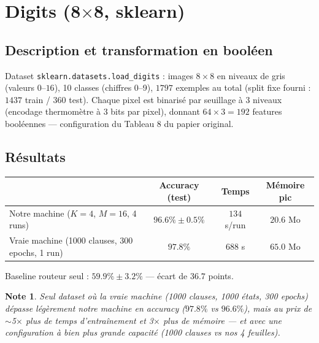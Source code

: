 \documentclass[12pt,a4paper]{article}
\newcommand{\code}[1]{\texttt{#1}}
\theoremstyle{plain}
\newtheorem{note}{Note}[section]
\begin{document}
\section{Digits (8$\times$8, sklearn)}

\subsection{Description et transformation en bool\'een}

Dataset \code{sklearn.datasets.load\_digits} : images $8\times 8$ en niveaux de gris (valeurs $0$--$16$), 10 classes (chiffres 0--9), $1797$ exemples au total (split fixe fourni : $1437$ train / $360$ test). Chaque pixel est binaris\'e par seuillage \`a 3 niveaux (encodage thermom\`etre \`a 3 bits par pixel), donnant $64 \times 3 = 192$ features bool\'eennes --- configuration du Tableau 8 du papier original.

\subsection{R\'esultats}

\begin{center}
\renewcommand{\arraystretch}{1.3}
\begin{tabular}{lccc}
\toprule
 & \textbf{Accuracy (test)} & \textbf{Temps} & \textbf{M\'emoire pic} \\
\midrule
Notre machine ($K{=}4$, $M{=}16$, 4 runs)          & $96.6\% \pm 0.5\%$ & $134$ s/run    & $20.6$ Mo \\
Vraie machine (1000 clauses, 300 epochs, 1 run)    & $97.8\%$           & $688$ s        & $65.0$ Mo \\
\bottomrule
\end{tabular}
\end{center}

\noindent\footnotesize Baseline routeur seul : $59.9\% \pm 3.2\%$ --- \'ecart de $36.7$ points.\normalsize

\begin{note}
Seul dataset o\`u la vraie machine (1000 clauses, 1000 \'etats, 300 epochs) d\'epasse l\'eg\`erement notre machine en accuracy ($97.8\%$ vs $96.6\%$), mais au prix de $\sim$5$\times$ plus de temps d'entra\^inement et 3$\times$ plus de m\'emoire --- et avec une configuration \`a bien plus grande capacit\'e (1000 clauses vs nos 4 feuilles).
\end{note}
\end{document}

